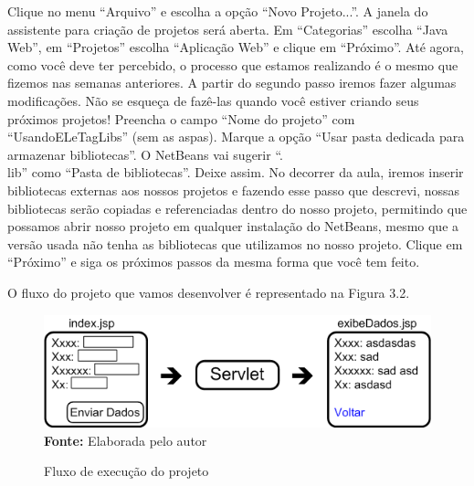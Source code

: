 Clique no menu ``Arquivo'' e escolha a opção ``Novo Projeto...''. A janela do assistente para criação de projetos será aberta. Em ``Categorias'' escolha ``Java Web'', em ``Projetos'' escolha ``Aplicação Web'' e clique em ``Próximo''. Até agora, como você deve ter percebido, o processo que estamos realizando é o mesmo que fizemos nas semanas anteriores. A partir do segundo passo iremos fazer algumas modificações. Não se esqueça de fazê-las quando você estiver criando seus próximos projetos!
Preencha o campo ``Nome do projeto'' com ``UsandoELeTagLibs'' (sem as aspas). Marque a opção ``Usar pasta dedicada para armazenar bibliotecas''. O NetBeans vai sugerir ``.\\lib'' como ``Pasta de bibliotecas''. Deixe assim. No decorrer da aula, iremos inserir bibliotecas externas aos nossos projetos e fazendo esse passo que descrevi, nossas bibliotecas serão copiadas e referenciadas dentro do nosso projeto, permitindo que possamos abrir nosso projeto em qualquer instalação do NetBeans, mesmo que a versão usada não tenha as bibliotecas que utilizamos no nosso projeto. Clique em ``Próximo'' e siga os próximos passos da mesma forma que você tem feito.

% 

O fluxo do projeto que vamos desenvolver é representado na Figura 3.2.

\FloatBarrier
\begin{figure}[!htbp]
    \centering
    \caption{Fluxo de execução do projeto}
    \includegraphics[scale=0.7]{imagens/cap03Fluxo}
    \\\textbf{Fonte:} Elaborada pelo autor
    \label{fig:cap03Fluxo}
\end{figure}
\FloatBarrier

